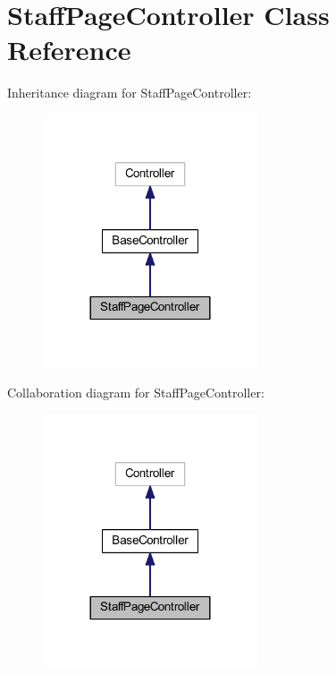 \hypertarget{class_staff_page_controller}{}\section{Staff\+Page\+Controller Class Reference}
\label{class_staff_page_controller}


Inheritance diagram for Staff\+Page\+Controller\+:
\nopagebreak
\begin{figure}[H]
\begin{center}
\leavevmode
\includegraphics[width=180pt]{class_staff_page_controller__inherit__graph}
\end{center}
\end{figure}


Collaboration diagram for Staff\+Page\+Controller\+:
\nopagebreak
\begin{figure}[H]
\begin{center}
\leavevmode
\includegraphics[width=180pt]{class_staff_page_controller__coll__graph}
\end{center}
\end{figure}
